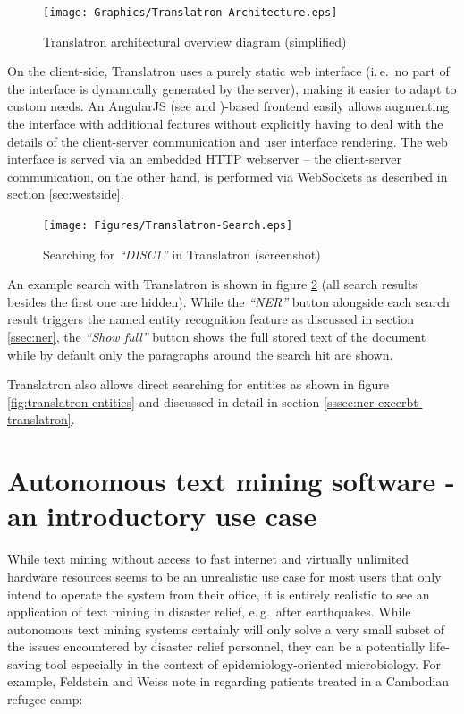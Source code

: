 \documentclass[a4paper, 12pt, twoside, reqn]{report}
\numberwithin{figure}{chapter}
\newtheorem[L]{boxedDefinition}{Definition}
\newtheorem[L]{boxedExample}{Example}
\newcommand{\ie}{i.\,e.\ }
\newcommand{\eg}{e.\,g.\ }
\newcommand{\itquote}[1]{\textit{{``}#1{''}}}
\begin{document}
\begin{figure}[!htb]
  \centering
  \texttt{[image: Graphics/Translatron-Architecture.eps]}
  \caption[Translatron architectural overview]{Translatron architectural overview diagram (simplified)}
  \label{fig:translatron-architecture}
\end{figure}

On the client-side, Translatron uses a purely static web interface (\ie no part of the interface is dynamically generated by the server), making it easier to adapt to custom needs. An AngularJS (see \cite{angularjs} and \cite{darwin2013angularjs})-based frontend easily allows augmenting the interface with additional features without explicitly having to deal with the details of the client-server communication and user interface rendering. The web interface is served via an embedded HTTP webserver -- the client-server communication, on the other hand, is performed via WebSockets as described in section \ref{sec:westside}.

\begin{figure}[!htb]
  \centering
  \texttt{[image: Figures/Translatron-Search.eps]}
  \caption[Translatron search example]{Searching for \itquote{DISC1} in Translatron (screenshot)}
  \label{fig:translatron-search}
\end{figure}

An example search with Translatron is shown in figure \ref{fig:translatron-search} (all search results besides the first one are hidden). While the \itquote{NER} button alongside each search result triggers the named entity recognition feature as discussed in section \ref{ssec:ner}, the \itquote{Show full} button shows the full stored text of the document while by default only the paragraphs around the search hit are shown.

Translatron also allows direct searching for entities as shown in figure \vref{fig:translatron-entities} and discussed in detail in section \ref{sssec:ner-excerbt-translatron}.

\section{Autonomous text mining software - an introductory use case}\label{sec:autonomous-textmining}

While text mining without access to fast internet and virtually unlimited hardware resources seems to be an unrealistic use case for most users that only intend to operate the system from their office, it is entirely realistic to see an application of text mining in disaster relief, \eg after earthquakes. While autonomous text mining systems certainly will only solve a very small subset of the issues encountered by disaster relief personnel, they can be a potentially life-saving tool especially in the context of epidemiology-oriented microbiology. For example, Feldstein and Weiss note in \cite{feldstein1982cambodian} regarding patients treated in a Cambodian refugee camp:
 
\end{document}
